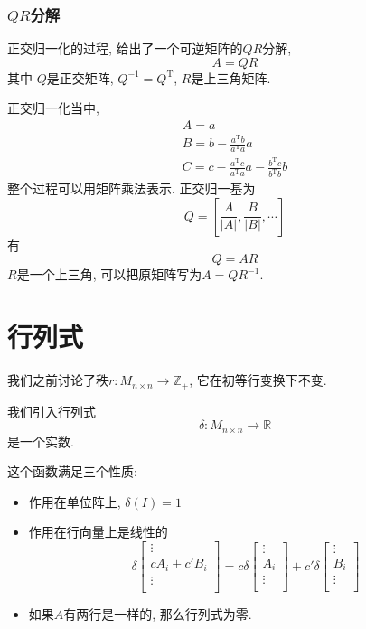 \subsubsection{$QR$分解}
正交归一化的过程, 给出了一个可逆矩阵的$QR$分解,
\begin{equation}
  A = QR
\end{equation}
其中 $Q$是正交矩阵, $Q^{-1} = Q^{\mathrm{T}}$, $R$是上三角矩阵.

正交归一化当中,
\begin{gather}
    A = a
    \\
    B = b - \frac{a^{\mathrm{T}}b}{a^{\mathrm{T}}a}a
    \\
    C = c - \frac{a^{\mathrm{T}}c}{a^{\mathrm{T}}a}a - \frac{b^{\mathrm{T}}c}{b^{\mathrm{T}}b}b
\end{gather}
整个过程可以用矩阵乘法表示. 正交归一基为
\begin{equation}
  Q = \left[ \frac{A}{|A|} , \frac{B}{|B|}, \cdots   \right] 
\end{equation}
有
\begin{equation}
  Q = AR
\end{equation}
$R$是一个上三角, 可以把原矩阵写为$A = Q R^{-1}$.

\section{行列式}
我们之前讨论了秩$r\colon M_{n \times n} \to \mathbb{Z}_{+}$, 它在初等行变换下不变.

我们引入行列式
\begin{equation}
  \delta\colon M_{n \times n} \to \mathbb{R}
\end{equation}
是一个实数.

这个函数满足三个性质:
\begin{itemize}
    \item 作用在单位阵上, $\delta(I) = 1$
    \item 作用在行向量上是线性的
    \begin{equation}
      \delta \begin{bmatrix}
       \vdots\\
       c A_i + c' B_i\\
       \vdots\\
      \end{bmatrix}
      =
      c \delta 
      \begin{bmatrix}
       \vdots\\
       A_i\\
       \vdots\\
      \end{bmatrix}
      +
      c'\delta
      \begin{bmatrix}
       \vdots\\
       B_i\\
       \vdots\\
      \end{bmatrix}
    \end{equation}

    \item 如果$A$有两行是一样的, 那么行列式为零.
\end{itemize}

